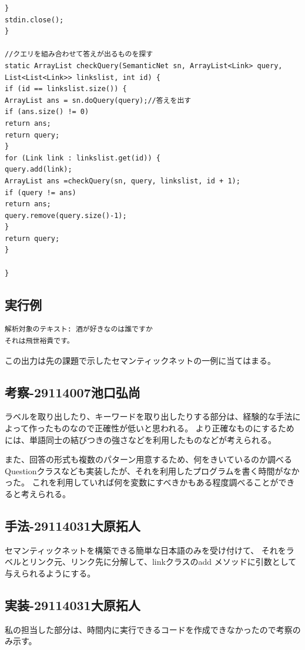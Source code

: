 \documentclass{jarticle}
\begin{document}
\begin{lstlisting}[caption=Link.HasSameWord,label=HasSameWord]
}
stdin.close();
}

//クエリを組み合わせて答えが出るものを探す
static ArrayList checkQuery(SemanticNet sn, ArrayList<Link> query, List<List<Link>> linkslist, int id) {
if (id == linkslist.size()) {
ArrayList ans = sn.doQuery(query);//答えを出す
if (ans.size() != 0)
return ans;
return query;
}
for (Link link : linkslist.get(id)) {
query.add(link);
ArrayList ans =checkQuery(sn, query, linkslist, id + 1);
if (query != ans)
return ans;
query.remove(query.size()-1);
}
return query;
}

}

\end{lstlisting}

\subsection{実行例}
\begin{lstlisting}
解析対象のテキスト: 酒が好きなのは誰ですか
それは飛世裕貴です。
\end{lstlisting}
この出力は先の課題で示したセマンティックネットの一例に当てはまる。
\subsection{考察-29114007池口弘尚}
ラベルを取り出したり、キーワードを取り出したりする部分は、経験的な手法によって作ったものなので正確性が低いと思われる。
より正確なものにするためには、単語同士の結びつきの強さなどを利用したものなどが考えられる。

また、回答の形式も複数のパターン用意するため、何をきいているのか調べるQuestionクラスなども実装したが、それを利用したプログラムを書く時間がなかった。
これを利用していれば何を変数にすべきかもある程度調べることができると考えられる。

\subsection{手法-29114031大原拓人}
セマンティックネットを構築できる簡単な日本語のみを受け付けて、
それをラベルとリンク元、リンク先に分解して、linkクラスのadd
メソッドに引数として与えられるようにする。

\subsection{実装-29114031大原拓人}
私の担当した部分は、時間内に実行できるコードを作成できなかったので考察のみ示す。
\end{document}
